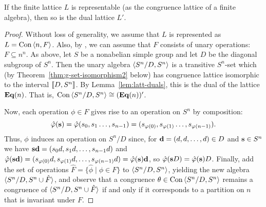 \begin{theorem}
  \label{thm:duals-interv-subl}
  If the finite lattice $L$ is representable (as the congruence lattice of a
  finite algebra), then so is the dual lattice $L'$.
\end{theorem}
\begin{proof}
  Without loss of generality, we assume that $L$ is represented
  as $L = \operatorname{Con\,} \langle n, F\rangle$.
  Also, by \cite[Theorem~4.18]{alvi:1987}, we can assume
  that $F$ consists of unary operations: $F \subseteq n^n$.  
  As above, let $S$ be a nonabelian simple group
  and let $D$ be the diagonal subgroup of $S^n$.
  Then the unary algebra $\langle S^n/D, S^n\rangle$  is a transitive $S^n$-set which (by
  Theorem~\ref{thm:g-set-isomorphism2} below) has congruence lattice isomorphic
  to the interval $\llbracket D, S^n\rrbracket$.  By Lemma~\ref{lem:latt-duals}, this is the dual
  of the lattice $\mathbf{Eq}(n)$.  That is, 
  $\operatorname{Con\,} \langle S^n/D, S^n\rangle \cong (\mathbf{Eq}(n))'$.


  
  Now, each operation $\phi \in F$ gives rise to an operation on $S^n$
  by composition:
  \[
  \hat{\varphi}(\mathbf{s}) = \hat{\varphi}(s_{0}, s_1  \dots, s_{n-1}) = (s_{\varphi(0)},
  s_{\varphi(1)}\dots, s_{\varphi(n-1)}). 
  \]
  Thus, $\phi$ induces  an operation on $S^n/D$ since, for 
  $\mathbf{d} = (d, d, \dots, d) \in D$ and $\mathbf{s} \in S^n$ we have 
  $\mathbf{s} \mathbf{d} = (s_{0}d, s_{1}d, \dots , s_{n-1}d)$ and 
  $\hat{\varphi}(\mathbf{s} \mathbf{d}) = (s_{\varphi(0)}d, s_{\varphi(1)}d, \dots , s_{\varphi(n-1)}d) = \hat{\varphi}(\mathbf{s}) \mathbf{d}$,
  so $\hat{\varphi}(\mathbf{s} D)  = \hat{\varphi}(\mathbf{s}) D$.  Finally, add the set of operations 
  $\hat{F} = \{\hat{\phi} \mid \phi \in F\}$ to $\langle S^n/D, S^n\rangle$, yielding the
  new algebra  $\langle S^n/D, S^n \cup \hat{F}\rangle$, and observe
  that a congruence $\theta \in \operatorname{Con\,}\langle S^n/D, S^n\rangle$ remains a congruence of
  $\langle S^n/D, S^n \cup \hat{F}\rangle$ if and only if it corresponds to a partition on
  $n$ that is invariant under $F$.
\end{proof}


